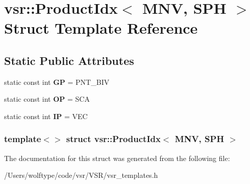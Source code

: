 \hypertarget{structvsr_1_1_product_idx_3_01_m_n_v_00_01_s_p_h_01_4}{\section{vsr\-:\-:Product\-Idx$<$ M\-N\-V, S\-P\-H $>$ Struct Template Reference}
\label{structvsr_1_1_product_idx_3_01_m_n_v_00_01_s_p_h_01_4}
}
\subsection*{Static Public Attributes}
\begin{DoxyCompactItemize}
\item 
\hypertarget{structvsr_1_1_product_idx_3_01_m_n_v_00_01_s_p_h_01_4_a445cad2ae03409af7817e1cf11afe9ad}{static const int {\bfseries G\-P} = P\-N\-T\-\_\-\-B\-I\-V}\label{structvsr_1_1_product_idx_3_01_m_n_v_00_01_s_p_h_01_4_a445cad2ae03409af7817e1cf11afe9ad}

\item 
\hypertarget{structvsr_1_1_product_idx_3_01_m_n_v_00_01_s_p_h_01_4_a379bc8be334673d622cb491d2a5bb347}{static const int {\bfseries O\-P} = S\-C\-A}\label{structvsr_1_1_product_idx_3_01_m_n_v_00_01_s_p_h_01_4_a379bc8be334673d622cb491d2a5bb347}

\item 
\hypertarget{structvsr_1_1_product_idx_3_01_m_n_v_00_01_s_p_h_01_4_a2ce0c48590face188b0243d912a5ccd3}{static const int {\bfseries I\-P} = V\-E\-C}\label{structvsr_1_1_product_idx_3_01_m_n_v_00_01_s_p_h_01_4_a2ce0c48590face188b0243d912a5ccd3}

\end{DoxyCompactItemize}
\subsubsection*{template$<$$>$ struct vsr\-::\-Product\-Idx$<$ M\-N\-V, S\-P\-H $>$}



The documentation for this struct was generated from the following file\-:\begin{DoxyCompactItemize}
\item 
/\-Users/wolftype/code/vsr/\-V\-S\-R/vsr\-\_\-templates.\-h\end{DoxyCompactItemize}
